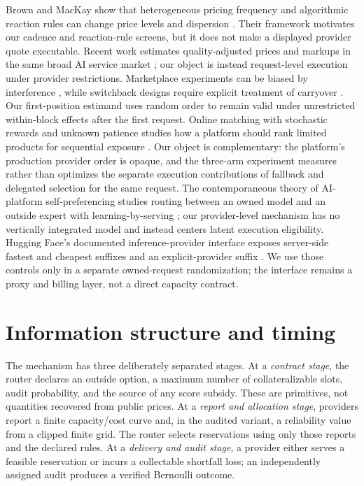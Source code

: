 \documentclass[11pt]{article}
\theoremstyle{definition}
\begin{document}
Brown and MacKay show that heterogeneous pricing frequency and algorithmic
reaction rules can change price levels and dispersion
\cite{brownmackay2023}. Their framework motivates our cadence and reaction-rule
screens, but it does not make a displayed provider quote executable. Recent
work estimates quality-adjusted prices and markups in the same broad AI service
market \cite{wang2026}; our object is instead request-level execution under
provider restrictions. Marketplace experiments can be biased by interference
\cite{holtz2025}, while switchback designs require explicit treatment of
carryover \cite{bojinov2023}. Our first-position estimand uses random order to
remain valid under unrestricted within-block effects after the first request.
Online matching with stochastic rewards and unknown patience studies how a
platform should rank limited products for sequential exposure
\cite{brubach2025}. Our object is complementary: the platform's production
provider order is opaque, and the three-arm experiment measures rather than
optimizes the separate execution contributions of fallback and delegated
selection for the same request.
The contemporaneous theory of AI-platform self-preferencing studies routing
between an owned model and an outside expert with learning-by-serving
\cite{zhang2026}; our provider-level mechanism has no vertically integrated
model and instead centers latent execution eligibility.
Hugging Face's documented inference-provider interface exposes server-side
fastest and cheapest suffixes and an explicit-provider suffix
\cite{hfinferenceproviders2026}. We use those controls only in a separate
owned-request randomization; the interface remains a proxy and billing layer,
not a direct capacity contract.

\section{Information structure and timing}
\label{sec:timing}

The mechanism has three deliberately separated stages. At a \emph{contract
stage}, the router declares an outside option, a maximum number of
collateralizable slots, audit probability, and the source of any score subsidy.
These are primitives, not quantities recovered from public prices. At a
\emph{report and allocation stage}, providers report a finite capacity/cost
curve and, in the audited variant, a reliability value from a clipped finite
grid. The router selects reservations using only those reports and the declared
rules. At a \emph{delivery and audit stage}, a provider either serves a feasible
reservation or incurs a collectable shortfall loss; an independently assigned
audit produces a verified Bernoulli outcome.
\end{document}
